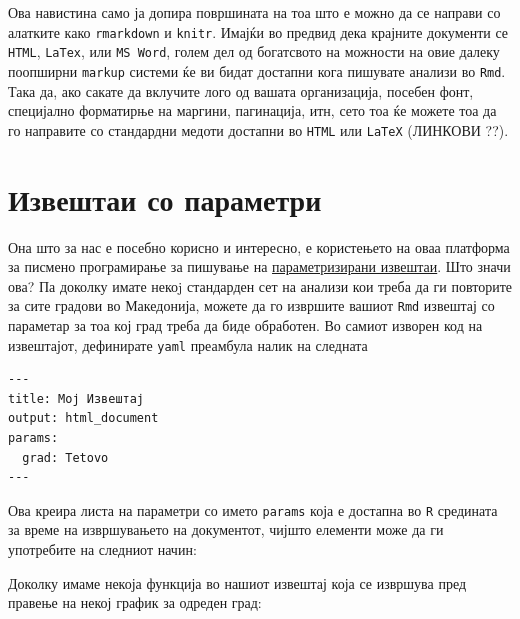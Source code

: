 \documentclass[
]{book}
\newenvironment{Shaded}{\begin{snugshade}}{\end{snugshade}}
\newcommand{\NormalTok}[1]{#1}
\newcommand{\OperatorTok}[1]{\textcolor[rgb]{0.81,0.36,0.00}{\textbf{#1}}}
\begin{document}
Ова навистина само ја допира површината на тоа што е можно да се направи со алатките како \texttt{rmarkdown} и \texttt{knitr}. Имајќи во предвид дека крајните документи се \texttt{HTML}, \texttt{LaTex}, или \texttt{MS\ Word}, голем дел од богатсвото на можности на овие далеку поопширни \texttt{markup} системи ќе ви бидат достапни кога пишувате анализи во \texttt{Rmd}. Така да, ако сакате да вклучите лого од вашата организација, посебен фонт, специјално форматирње на маргини, пагинација, итн, сето тоа ќе можете тоа да го направите со стандардни медоти достапни во \texttt{HTML} или \texttt{LaTeX} (ЛИНКОВИ \citet{NOCI}??).

\hypertarget{ux438ux437ux432ux435ux448ux442ux430ux438-ux441ux43e-ux43fux430ux440ux430ux43cux435ux442ux440ux438}{%
\section{Извештаи со параметри}\label{ux438ux437ux432ux435ux448ux442ux430ux438-ux441ux43e-ux43fux430ux440ux430ux43cux435ux442ux440ux438}}

Она што за нас е посебно корисно и интересно, е користењето на оваа платформа за писмено програмирање за пишување на \href{https://rmarkdown.rstudio.com/developer_parameterized_reports.html\%23parameter_types\%2F}{параметризирани извештаи}. Што значи ова? Па доколку имате некоj стандарден сет на анализи кои треба да ги повторите за сите градови во Македонија, можете да го извршите вашиот \texttt{Rmd} извештај со параметар за тоа кој град треба да биде обработен. Во самиот изворен код на извештајот, дефинирате \texttt{yaml} преамбула налик на следната

\begin{verbatim}
---
title: Мој Извештај
output: html_document
params:
  grad: Tetovo
---
\end{verbatim}

Ова креира листа на параметри со името \texttt{params} која е достапна во \texttt{R} средината за време на извршувањето на документот, чијшто елементи може да ги употребите на следниот начин:

\begin{Shaded}
\end{Shaded}

Доколку имаме некоја функција во нашиот извештај која се извршува пред правење на некој график за одреден град:
\end{document}
